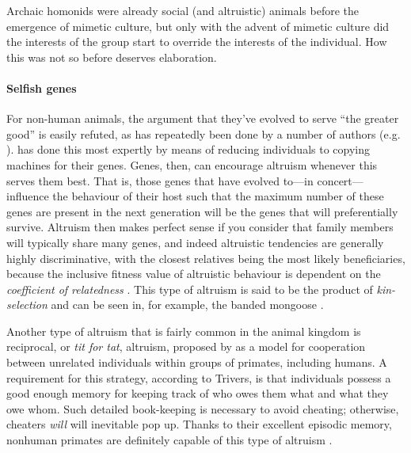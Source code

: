 \documentclass{article}
\begin{document}
Archaic homonids were already social (and altruistic) animals before the
emergence of mimetic culture, but only with the advent of mimetic culture did
the interests of the group start to override the interests of the individual.
How this was not so before deserves elaboration.

\paragraph{Selfish genes}


For non-human animals, the argument that they've evolved to serve “the greater
good” is easily refuted, as has repeatedly been done by a number of authors
(e.g. \citealp{hamilton1964, dawkins1976}). \citet{dawkins1976} has done this
most expertly by means of reducing individuals to copying machines for their
genes. Genes, then, can encourage altruism whenever this serves them best. That
is, those genes that have evolved to---in concert---influence the behaviour of
their host such that the maximum number of these genes are present in the next
generation will be the genes that will preferentially survive. Altruism then
makes perfect sense if you consider that family members will typically share
many genes, and indeed altruistic tendencies are generally highly
discriminative, with the closest relatives being the most likely beneficiaries,
because the inclusive fitness value of altruistic behaviour is dependent on the
\textit{coefficient of relatedness} \citep{hamilton1964}. This type of altruism
is said to be the product of \emph{kin-selection} and can be seen in, for
example, the banded mongoose \citep{gilchrist2004a, gilchrist2004b, hodge2005}.

Another type of altruism that is fairly common in the animal kingdom is
reciprocal, or \emph{tit for tat}, altruism, proposed by \citet{trivers1971}
as a model for cooperation between unrelated individuals within groups
of primates, including humans. A requirement for this strategy, according to
Trivers, is that individuals possess a good enough memory for keeping track of who
owes them what and what they owe whom. Such detailed book-keeping is necessary
to avoid cheating; otherwise, cheaters \textit{will} will inevitable pop up.
Thanks to their excellent episodic memory, nonhuman primates are definitely
capable of this type of altruism \citep{waal1996}.
\end{document}
